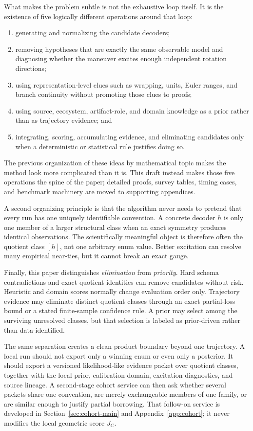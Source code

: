\documentclass[11pt]{article}
\begin{document}
    What makes the problem subtle is not the exhaustive loop itself. It is the existence of
    five logically different operations around that loop:
    \begin{enumerate}[nosep]
    \item generating and normalizing the candidate decoders;
    \item removing hypotheses that are exactly the same observable model and diagnosing
    whether the maneuver excites enough independent rotation directions;
    \item using representation-level clues such as wrapping, units, Euler ranges, and
    branch continuity without promoting those clues to proofs;
    \item using source, ecosystem, artifact-role, and domain knowledge as a prior rather
    than as trajectory evidence; and
    \item integrating, scoring, accumulating evidence, and eliminating candidates only
    when a deterministic or statistical rule justifies doing so.
    \end{enumerate}
    The previous organization of these ideas by mathematical topic makes the method look more
    complicated than it is. This draft instead makes those five operations the spine of the
    paper; detailed proofs, survey tables, timing cases, and benchmark machinery are moved to
    supporting appendices.

    A second organizing principle is that the algorithm never needs to pretend that every
    run has one uniquely identifiable convention. A concrete decoder $h$ is only one member
    of a larger structural class when an exact symmetry produces identical observations.
    The scientifically meaningful object is therefore often the quotient class $[h]$, not
    one arbitrary enum value. Better excitation can resolve many empirical near-ties, but it
    cannot break an exact gauge.

    Finally, this paper distinguishes \emph{elimination} from \emph{priority}. Hard schema
    contradictions and exact quotient identities can remove candidates without risk.
    Heuristic and domain scores normally change evaluation order only. Trajectory evidence
    may eliminate distinct quotient classes through an exact partial-loss bound or a stated
    finite-sample confidence rule. A prior may select among the surviving unresolved
    classes, but that selection is labeled as prior-driven rather than data-identified.


    The same separation creates a clean product boundary beyond one trajectory. A local run
    should not export only a winning enum or even only a posterior. It should export a
    versioned likelihood-like evidence packet over quotient classes, together with the local
    prior, calibration domain, excitation diagnostics, and source lineage. A second-stage
    cohort service can then ask whether several packets share one convention, are merely
    exchangeable members of one family, or are similar enough to justify partial borrowing.
    That follow-on service is developed in Section~\ref{sec:cohort-main} and
    Appendix~\ref{app:cohort}; it never modifies the local geometric score $J_C$.
\end{document}
